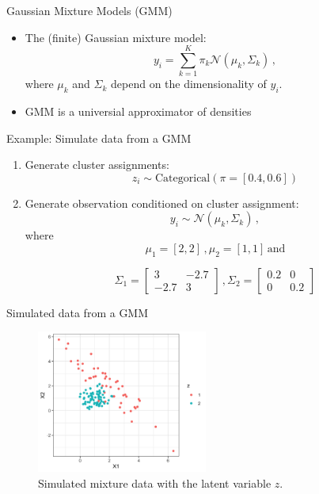 \documentclass[10pt]{beamer}
\begin{document}
\begin{frame}{Gaussian Mixture Models (GMM)}

\begin{itemize}
\item The (finite) Gaussian mixture model:
\[
y_i = \sum_{k=1}^K \pi_k \mathcal{N}(\mu_k, \Sigma_k)\,,
\]
where $\mu_k$ and $\Sigma_k$ depend on the dimensionality of $y_i$.\pause
\item GMM is a {\color{uured} universial approximator} of densities
\end{itemize}

\end{frame}

\begin{frame}{Example: Simulate data from a GMM}

\begin{enumerate}
\item Generate cluster assignments:
\[
z_i \sim \text{Categorical}(\pi = [0.4, 0.6])
\]
\item Generate observation conditioned on cluster assignment:
\[
y_i \sim \mathcal{N}(\mu_k, \Sigma_k)\,,
\]
where
\[
\mu_1 = [2, 2]\,, \mu_2 = [1, 1]\, \text{and}
\]

\[
\Sigma_1 = \begin{bmatrix} 3 & -2.7\\ -2.7 & 3 \end{bmatrix}\,,\Sigma_2 = \begin{bmatrix} 0.2 & 0\\ 0 & 0.2 \end{bmatrix}
\]

\end{enumerate}

\end{frame}


\begin{frame}{Simulated data from a GMM}

\begin{figure}[h]
\centering
\includegraphics[width=0.5\textwidth]{fig/mix_models_z.png}
\caption{Simulated mixture data with the latent variable $z$.}
\end{figure}

\end{frame}
\end{document}
